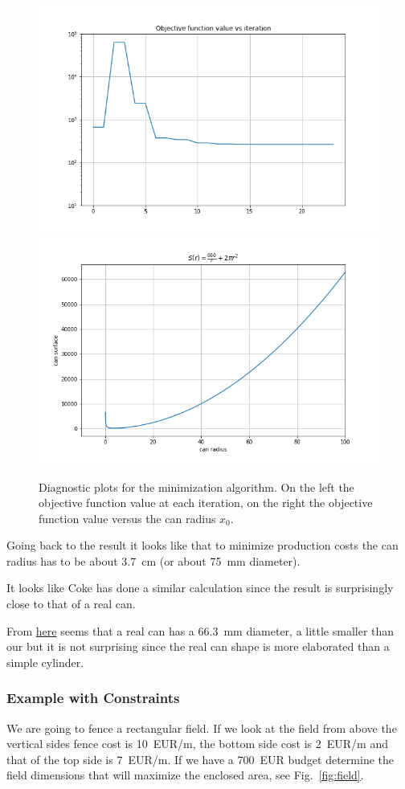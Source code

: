 \begin{figure}[htb]
	\centering
	\includegraphics[width=0.45\linewidth]{figures/objective_function_value}
	\includegraphics[width=0.45\linewidth]{figures/can_surface}
	\caption{Diagnostic plots for the minimization algorithm. On the left the objective function value at each iteration, on the right the objective function value versus the can radius $x_0$.}
	\label{fig:minimization_diagnostic}
\end{figure}

Going back to the result it looks like that to minimize production costs the can radius has to be about 3.7~cm (or about 75~mm diameter).

\begin{curiosity}
It looks like Coke has done a similar calculation since the result is surprisingly close to that of a real can. 

From \href{	https://www.ball.com/eu/solutions/markets-capabilities/capabilities/beverage-cans/standard-range
}{here} seems that a real can has a 66.3~mm diameter, a little smaller than our but it is not surprising since the real can shape is more elaborated than a simple cylinder.
\end{curiosity}

\subsubsection{Example with Constraints}
\label{example-with-constraint}

We are going to fence a rectangular field. If we look at the field from above the vertical sides fence cost is 10~EUR/m, the bottom side cost is 2~EUR/m and that of the top side is 7~EUR/m. If we have a 700~EUR budget determine
the field dimensions that will maximize the enclosed area, see Fig.~\ref{fig:field}.

